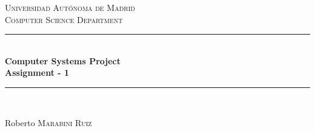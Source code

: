 \documentclass[12pt]{article} %
\begin{document}

\begin{titlepage}

\newcommand{\HRule}{\rule{\linewidth}{0.5mm}} %

\center %

\textsc{\LARGE Universidad Aut\'{o}noma de Madrid}\\[1.5cm] %
\textsc{\Large Computer Science Department}\\[0.5cm] %

\HRule \\[0.4cm]
{ \huge \bfseries Computer Systems Project\\[0.5cm] Assignment - 1}\\[0.4cm] %
\HRule \\[1.5cm]





\vfill %
\begin{flushright}
 \large
Roberto  \textsc{Marabini Ruiz} %
\end{flushright}

\end{titlepage}
\end{document}
